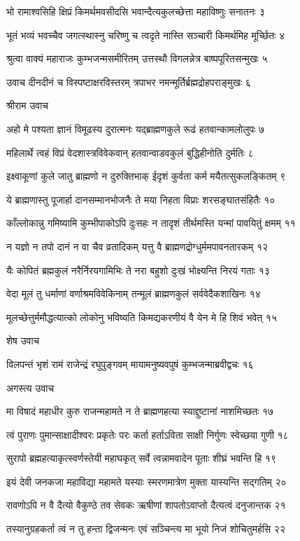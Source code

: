 भो रामाश्वसिहि क्षिप्रं किमर्थमवसीदसि
भवान्दैत्यकुलच्छेत्ता महाविष्णुः सनातनः ३

भूतं भव्यं भवच्चैव जगत्स्थास्नु चरिष्णु च
त्वदृते नास्ति सञ्चारी किमर्थमिह मूर्च्छितः ४

श्रुत्वा वाक्यं महाराजः कुम्भजन्मसमीरितम्
उत्तस्थौ विगलन्नेत्र बाष्पपूरितसन्मुखः ५

उवाच दीनदीनं च विस्पष्टाक्षरविस्तरम्
त्रपाभर नमन्मूर्तिर्ब्रह्मद्रोहपराङ्मुखः ६

श्रीराम उवाच

अहो मे पश्यता ज्ञानं विमूढस्य दुरात्मनः
यद्ब्राह्मणकुले रूढं हतवान्कामलोलुपः ७

महिलार्थे त्वहं विप्रं वेदशास्त्रविवेकवान्
हतवान्वाडवकुलं बुद्धिहीनोति दुर्मतिः ८

इक्ष्वाकूणां कुले जातु ब्राह्मणो न दुरुक्तिभाक्
ईदृशं कुर्वता कर्म मयैतत्सुकलङ्कितम् ९

ये ब्राह्मणास्तु पूजार्हा दानसम्मानभोजनैः
ते मया निहता विप्राः शरसङ्घातसंहितैः १०

काँल्लोकान्नु गमिष्यामि कुम्भीपाकोऽपि दुःसहः
न तादृशं तीर्थमस्ति यन्मां पावयितुं क्षमम् ११

न यज्ञो न तपो दानं न वा चैव व्रतादिकम्
यत्तु वै ब्राह्मणद्रोग्धुर्ममपावनतारकम् १२

यैः कोपितं ब्रह्मकुलं नरैर्निरयगामिभिः
ते नरा बहुशो दुःखं भोक्ष्यन्ति निरयं गताः १३

वेदा मूलं तु धर्माणां वर्णाश्रमविवेकिनाम्
तन्मूलं ब्राह्मणकुलं सर्ववेदैकशाखिनः १४

मूलच्छेत्तुर्ममौद्धत्यात्को लोकोनु भविष्यति
किमद्यकरणीयं वै येन मे हि शिवं भवेत् १५

शेष उवाच

विलपन्तं भृशं रामं राजेन्द्रं रघुपुङ्गवम्
मायामनुष्यवपुषं कुम्भजन्माब्रवीद्वचः १६

अगस्त्य उवाच

मा विषादं महाधीर कुरु राजन्महामते
न ते ब्राह्मणहत्या स्याद्दुष्टानां नाशमिच्छतः १७

त्वं पुराणः पुमान्साक्षादीश्वरः प्रकृतेः परः
कर्ता हर्ताऽविता साक्षी निर्गुणः स्वेच्छया गुणी १८

सुरापो ब्रह्महत्याकृत्स्वर्णस्तेयी महाघकृत्
सर्वे त्वन्नामवादेन पूताः शीघ्रं भवन्ति हि १९

इयं देवी जनकजा महाविद्या महामते
यस्याः स्मरणमात्रेण मुक्ता यास्यन्ति सद्गतिम् २०

रावणोऽपि न वै दैत्यो वैकुण्ठे तव सेवकः
ऋषीणां शापतोऽवाप्तो दैत्यत्वं दनुजान्तक २१

तस्यानुग्रहकर्ता त्वं न तु हन्ता द्विजन्मनः
एवं सञ्चिन्त्य मा भूयो निजं शोचितुमर्हसि २२

